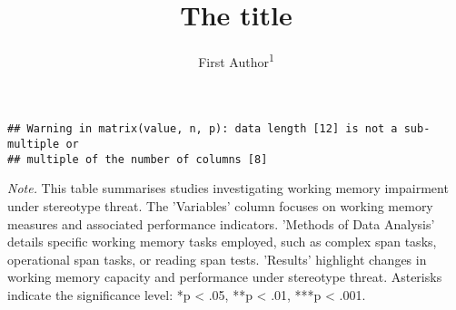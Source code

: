 \documentclass[
  stu, a4paper]{apa7}
\title{The title}
\author{First Author\textsuperscript{1}}
\date{}
\affiliation{\vspace{0.5cm}\textsuperscript{1} Wilhelm-Wundt-University}
\newenvironment{lltable}{\begin{landscape}\centering\begin{ThreePartTable}}{\end{ThreePartTable}\end{landscape}}
\begin{document}
\maketitle

\begin{verbatim}
## Warning in matrix(value, n, p): data length [12] is not a sub-multiple or
## multiple of the number of columns [8]
\end{verbatim}

\begin{lltable}

\begin{TableNotes}[para]
\normalsize{\textit{Note.} This table summarises studies investigating working memory impairment under stereotype threat. The 'Variables' column focuses on working memory measures and associated performance indicators. 'Methods of Data Analysis' details specific working memory tasks employed, such as complex span tasks, operational span tasks, or reading span tests. 'Results' highlight changes in working memory capacity and performance under stereotype threat. Asterisks indicate the significance level: *p < .05, **p < .01, ***p < .001.}
\end{TableNotes}


\end{lltable}
\end{document}
